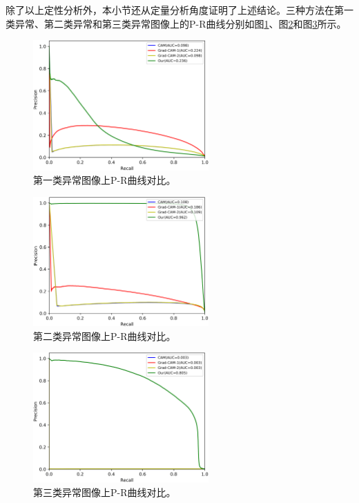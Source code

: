 除了以上定性分析外，本小节还从定量分析角度证明了上述结论。三种方法在第一类异常、第二类异常和第三类异常图像上的P-R曲线分别如图\ref{fig:multi_simulate_pr_curve_image_net}、图\ref{fig:multi_simulate_pr_curve_skin}和图\ref{fig:multi_simulate_pr_curve_circle}所示。
\begin{figure}[H]
	\centering
	\includegraphics[width=0.6\textwidth]{figure/pr_curve_multi_skin/IMAGE_NET_pr_curve.png}
	\caption[第一类异常图像上P-R曲线对比]{第一类异常图像上P-R曲线对比。} 
	\label{fig:multi_simulate_pr_curve_image_net}
\end{figure}
\begin{figure}[H]
	\centering
	\includegraphics[width=0.6\textwidth]{figure/pr_curve_multi_skin/SKIN_pr_curve.png}
	\caption[第二类异常图像上P-R曲线对比]{第二类异常图像上P-R曲线对比。} 
	\label{fig:multi_simulate_pr_curve_skin}
\end{figure}
\begin{figure}[H]
	\centering
	\includegraphics[width=0.6\textwidth]{figure/pr_curve_multi_skin/CIRCLE_pr_curve.png}
	\caption[第三类异常图像上P-R曲线对比]{第三类异常图像上P-R曲线对比。}
	\label{fig:multi_simulate_pr_curve_circle}
\end{figure}

